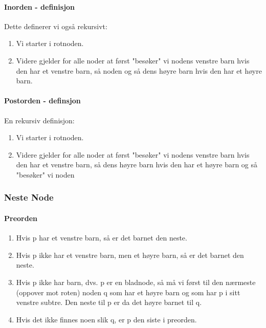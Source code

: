 \documentclass[11pt]{article}
\begin{document}
        \paragraph{Inorden - definisjon}
        Dette definerer vi også rekursivt:\\
        \begin{enumerate}
            \item Vi starter i rotnoden.
            \item Videre gjelder for alle noder at først "besøker" vi nodens venstre barn hvis den har et
                venstre barn, så noden og så dens høyre barn hvis den har et høyre barn.
        \end{enumerate}
        \paragraph{Postorden - definsjon}
        En rekursiv definisjon: \\
        \begin{enumerate}
            \item Vi starter i rotnoden.
            \item Videre gjelder for alle noder at først "besøker" vi nodens venstre barn hvis den har et
                venstre barn, så dens høyre barn hvis den har et høyre barn og så "besøker" vi noden
        \end{enumerate}

        \subsubsection{Neste Node}
            \paragraph{Preorden}
            \begin{enumerate}
                \item Hvis p har et venstre barn, så er det barnet den neste.
                \item Hvis p ikke har et venstre barn, men et høyre barn, så er det barnet den neste.
                \item Hvis p ikke har barn, dvs. p er en bladnode, så må vi først til den nærmeste (oppover
                    mot roten) noden q som har et høyre barn og som har p i sitt venstre subtre. Den neste
                    til p er da det høyre barnet til q.
                \item Hvis det ikke finnes noen slik q, er p den siste i preorden.
            \end{enumerate}
\end{document}
